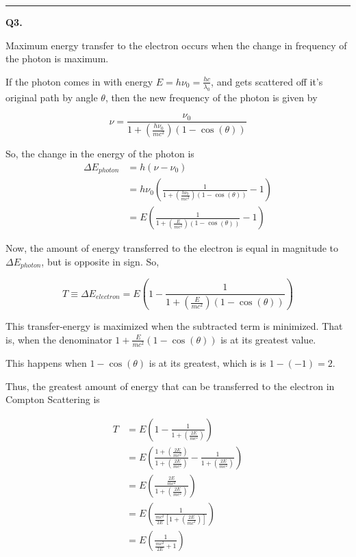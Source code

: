 \documentclass[twoside]{article}
\begin{document}
\vskip 0.25cm
\hrule
\vskip 1cm


\textbf{Q3.} 

Maximum energy transfer to the electron occurs when the change in frequency of the photon is maximum.

If the photon comes in with energy $E = h \nu_0 = \frac{hc}{\lambda_0}$, and gets scattered off it's original path by angle $\theta$, then the new frequency of the photon is given by

\[ \nu = \frac{\nu_0}{1 + \left( \frac{h\nu_0}{mc^2} \right)(1 - \cos(\theta))} \]

So, the change in the energy of the photon is 
\begin{align*}
   \Delta E_{photon} &= h(\nu - \nu_0) \\
   &= h\nu_0 \left( \frac{1}{1 + \left( \frac{h\nu_0}{mc^2} \right)(1 - \cos(\theta))} - 1 \right) \\
   &= E \left( \frac{1}{1 + \left( \frac{E}{mc^2} \right)(1 - \cos(\theta))} - 1 \right)
\end{align*}

Now, the amount of energy transferred to the electron is equal in magnitude to $\Delta E_{photon}$, but is opposite in sign. So,

\[ \boxed{ T \equiv \Delta E_{electron} = E \left( 1 - \frac{1}{1 + \left( \frac{E}{mc^2} \right)(1 - \cos(\theta))} \right) } \]

This transfer-energy is maximized when the subtracted term is minimized. That is, when the denominator $1 + \frac{E}{mc^2}(1 - \cos(\theta))$ is at its greatest value.

This happens when $1-\cos(\theta)$ is at its greatest, which is is $1-(-1) = 2$.

Thus, the greatest amount of energy that can be transferred to the electron in Compton Scattering is

\begin{align*}
   T &=  E \left( 1 - \frac{1}{1 + \left( \frac{2E}{mc^2} \right)} \right) \\
   &= E \left(\frac{1 + \left( \frac{2E}{mc^2} \right)}{1 + \left( \frac{2E}{mc^2} \right)} - \frac{1}{1 + \left( \frac{2E}{mc^2} \right)} \right) \\
   &=  E \left( \frac{\frac{2E}{mc^2}}{1 + \left( \frac{2E}{mc^2} \right)} \right) \\
   &=  E \left( \frac{1}{\frac{mc^2}{2E} \left[1 + \left( \frac{2E}{mc^2} \right)\right]} \right) \\
   &=  E \left( \frac{1}{\frac{mc^2}{2E} + 1} \right) \\
\end{align*}
\end{document}

